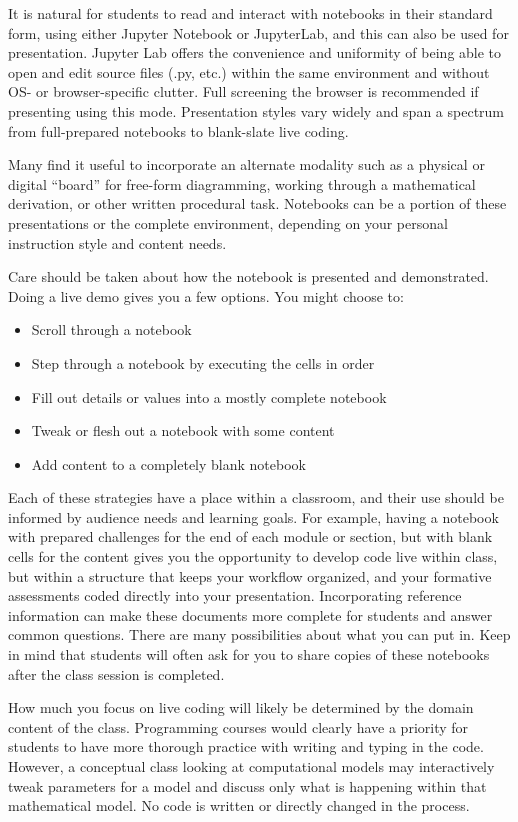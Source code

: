 \documentclass[]{book}
\providecommand{\tightlist}{%
  \setlength{\itemsep}{0pt}\setlength{\parskip}{0pt}}
\begin{document}
It is natural for students to read and interact with notebooks in their
standard form, using either Jupyter Notebook or JupyterLab, and this can
also be used for presentation. Jupyter Lab offers the convenience and
uniformity of being able to open and edit source files (.py, etc.)
within the same environment and without OS- or browser-specific clutter.
Full screening the browser is recommended if presenting using this mode.
Presentation styles vary widely and span a spectrum from full-prepared
notebooks to blank-slate live coding.

Many find it useful to incorporate an alternate modality such as a
physical or digital ``board'' for free-form diagramming, working through
a mathematical derivation, or other written procedural task. Notebooks
can be a portion of these presentations or the complete environment,
depending on your personal instruction style and content needs.

Care should be taken about how the notebook is presented and
demonstrated. Doing a live demo gives you a few options. You might
choose to:

\begin{itemize}
\tightlist
\item
  Scroll through a notebook
\item
  Step through a notebook by executing the cells in order
\item
  Fill out details or values into a mostly complete notebook
\item
  Tweak or flesh out a notebook with some content
\item
  Add content to a completely blank notebook
\end{itemize}

Each of these strategies have a place within a classroom, and their use
should be informed by audience needs and learning goals. For example,
having a notebook with prepared challenges for the end of each module or
section, but with blank cells for the content gives you the opportunity
to develop code live within class, but within a structure that keeps
your workflow organized, and your formative assessments coded directly
into your presentation. Incorporating reference information can make
these documents more complete for students and answer common questions.
There are many possibilities about what you can put in. Keep in mind
that students will often ask for you to share copies of these notebooks
after the class session is completed.

How much you focus on live coding will likely be determined by the
domain content of the class. Programming courses would clearly have a
priority for students to have more thorough practice with writing and
typing in the code. However, a conceptual class looking at computational
models may interactively tweak parameters for a model and discuss only
what is happening within that mathematical model. No code is written or
directly changed in the process.
\end{document}
